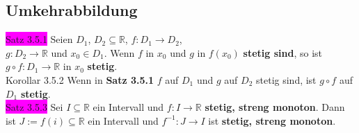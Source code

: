 \documentclass[landscape, 10pt]{article}
\newcommand{\R}{\mathbb{R}}
\begin{document}
\begin{multicols}{3}
       \subsection{Umkehrabbildung}
              \colorbox{magenta}{Satz 3.5.1}
                     Seien \textcolor{NavyBlue}{$D_1$},
                     \textcolor{NavyBlue}{$D_2\subseteq\R$}, 
                     \textcolor{NavyBlue}{$f:D_1\longrightarrow D_2$}, \\
                     \textcolor{NavyBlue}{$g:D_2\longrightarrow\R$} und 
                     \textcolor{NavyBlue}{$x_0\in D_1$}.
                     Wenn \textcolor{NavyBlue}{$f$} in 
                     \textcolor{NavyBlue}{$x_0$} und 
                     \textcolor{NavyBlue}{$g$} in
                     \textcolor{NavyBlue}{$f(x_0)$} 
                     \textbf{stetig sind}, 
                     so ist \textcolor{NavyBlue}{
                     $g\circ f:D_1\longrightarrow\R$} in
                     \textcolor{NavyBlue}{$x_0$} 
                     \textbf{stetig}.\\
              \colorbox{BurntOrange}{Korollar 3.5.2} 
                     Wenn in \textbf{Satz 3.5.1} 
                     \textcolor{NavyBlue}{$f$} auf 
                     \textcolor{NavyBlue}{$D_1$} und 
                     \textcolor{NavyBlue}{$g$} auf \textcolor{NavyBlue}{$D_2$}
                     stetig sind, ist \textcolor{NavyBlue}{$g\circ f$} auf 
                     \textcolor{NavyBlue}{$D_1$}
                     \textbf{stetig}.\\
              \colorbox{magenta}{Satz 3.5.3} 
                     Sei \textcolor{NavyBlue}{$I\subseteq\R$} 
                     ein Intervall und 
                     \textcolor{NavyBlue}{$f:I\longrightarrow\R$} 
                     \textbf{stetig, streng monoton}. Dann ist 
                     \textcolor{NavyBlue}{$J:=f(i)\subseteq\R$} ein Intervall 
                     und \textcolor{NavyBlue}{$f^{-1}:J\longrightarrow I$} 
                     ist \textbf{stetig, streng monoton}.

\end{multicols}
\end{document}
